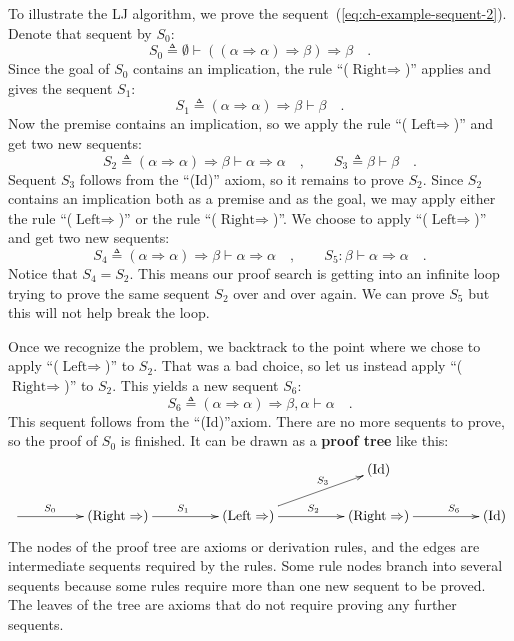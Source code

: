 To illustrate the LJ algorithm, we prove the sequent~(\ref{eq:ch-example-sequent-2}).
Denote that sequent by $S_{0}$:
\[
S_{0}\triangleq\emptyset\vdash\left(\left(\alpha\Rightarrow\alpha\right)\Rightarrow\beta\right)\Rightarrow\beta\quad.
\]
 Since the goal of $S_{0}$ contains an implication, the rule \textsf{``}($\text{Right}\Rightarrow$)\textsf{''}
applies and gives the sequent $S_{1}$:
\[
S_{1}\triangleq\left(\alpha\Rightarrow\alpha\right)\Rightarrow\beta\vdash\beta\quad.
\]
Now the premise contains an implication, so we apply the rule \textsf{``}($\text{Left}\Rightarrow$)\textsf{''}
and get two new sequents:
\[
S_{2}\triangleq\left(\alpha\Rightarrow\alpha\right)\Rightarrow\beta\vdash\alpha\Rightarrow\alpha\quad,\quad\quad S_{3}\triangleq\beta\vdash\beta\quad.
\]
Sequent $S_{3}$ follows from the \textsf{``}(Id)\textsf{''} axiom, so it remains
to prove $S_{2}$. Since $S_{2}$ contains an implication both as
a premise and as the goal, we may apply either the rule \textsf{``}($\text{Left}\Rightarrow$)\textsf{''}
or the rule \textsf{``}($\text{Right}\Rightarrow$)\textsf{''}. We choose to apply
\textsf{``}($\text{Left}\Rightarrow$)\textsf{''} and get two new sequents:
\[
S_{4}\triangleq\left(\alpha\Rightarrow\alpha\right)\Rightarrow\beta\vdash\alpha\Rightarrow\alpha\quad,\quad\quad S_{5}:\beta\vdash\alpha\Rightarrow\alpha\quad.
\]
Notice that $S_{4}=S_{2}$. This means our proof search is getting
into an infinite loop trying to prove the same sequent $S_{2}$ over
and over again. We can prove $S_{5}$ but this will not help break
the loop.

Once we recognize the problem, we backtrack to the point where we
chose to apply \textsf{``}($\text{Left}\Rightarrow$)\textsf{''} to $S_{2}$. That
was a bad choice, so let us instead apply \textsf{``}($\text{Right}\Rightarrow$)\textsf{''}
to $S_{2}$. This yields a new sequent $S_{6}$:
\[
S_{6}\triangleq\left(\alpha\Rightarrow\alpha\right)\Rightarrow\beta,\alpha\vdash\alpha\quad.
\]
This sequent follows from the \textsf{``}(Id)\textsf{''}axiom. There are no more sequents
to prove, so the proof of $S_{0}$ is finished. It can be drawn as
a \textbf{proof tree} like this:
\[
\xymatrix{\xyScaleY{1.5pc}\xyScaleX{4pc} &  &  & (\text{Id})\\
\ar[r]\sp(0.35){S_{0}} & (\text{Right}\Rightarrow)\ar[r]\sp(0.5){S_{1}} & (\text{Left}\Rightarrow)\ar[r]\sp(0.5){S_{2}}\ar[ru]\sp(0.6){S_{3}} & (\text{Right}\Rightarrow)\ar[r]\sp(0.65){S_{6}} & (\text{Id})
}
\]
The nodes of the proof tree are axioms or derivation rules, and the
edges are intermediate sequents required by the rules. Some rule nodes
branch into several sequents because some rules require more than
one new sequent to be proved. The leaves of the tree are axioms that
do not require proving any further sequents. 


